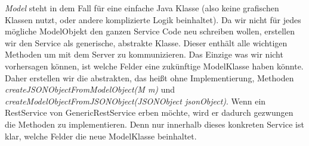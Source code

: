 \documentclass[11pt]{scrartcl}
\begin{document}
\textit{Model} steht in dem Fall für eine einfache Java Klasse (also keine grafischen
Klassen nutzt, oder andere komplizierte Logik beinhaltet).
Da wir nicht für jedes mögliche ModelObjekt den ganzen Service Code 
neu schreiben wollen, erstellen wir den Service als 
generische, abstrakte Klasse. Dieser enthält alle wichtigen Methoden
um mit dem Server zu kommunizieren. 
Das Einzige was wir nicht vorhersagen können, ist welche 
Felder eine zukünftige ModelKlasse haben könnte. Daher 
erstellen wir die abstrakten, das heißt ohne Implementierung, Methoden
\textit{createJSONObjectFromModelObject(M m)} und \textit{createModelObjectFromJSONObject(JSONObject jsonObject)}.
Wenn ein RestService von GenericRestService erben möchte, wird
er dadurch gezwungen die Methoden zu implementieren.
Denn nur innerhalb dieses konkreten Service ist klar, welche
Felder die neue ModelKlasse beinhaltet.
\end{document}
